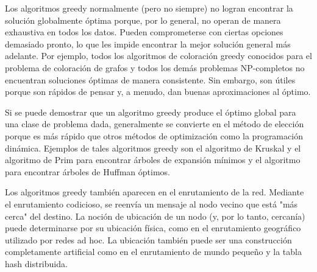 Los algoritmos greedy normalmente (pero no siempre) no logran encontrar la solución globalmente óptima porque, por lo general, no operan de manera exhaustiva en todos los datos. Pueden comprometerse con ciertas opciones demasiado pronto, lo que les impide encontrar la mejor solución general más adelante. Por ejemplo, todos los algoritmos de coloración greedy conocidos para el problema de coloración de grafos y todos los demás problemas NP-completos no encuentran soluciones óptimas de manera consistente. Sin embargo, son útiles porque son rápidos de pensar y, a menudo, dan buenas aproximaciones al óptimo.

Si se puede demostrar que un algoritmo greedy produce el óptimo global para una clase de problema dada, generalmente se convierte en el método de elección porque es más rápido que otros métodos de optimización como la programación dinámica. Ejemplos de tales algoritmos greedy son el algoritmo de Kruskal y el algoritmo de Prim para encontrar árboles de expansión mínimos y el algoritmo para encontrar árboles de Huffman óptimos.

Los algoritmos greedy también aparecen en el enrutamiento de la red. Mediante el enrutamiento codicioso, se reenvía un mensaje al nodo vecino que está "más cerca" del destino. La noción de ubicación de un nodo (y, por lo tanto, cercanía) puede determinarse por su ubicación física, como en el enrutamiento geográfico utilizado por redes ad hoc. La ubicación también puede ser una construcción completamente artificial como en el enrutamiento de mundo pequeño y la tabla hash distribuida.